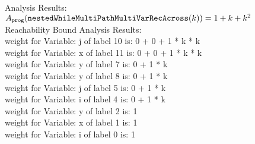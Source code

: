                                     Analysis Results: $ A_{\mathtt{prog}}(\mathtt{nestedWhileMultiPathMultiVarRecAcross}(k)) = 1 + k + k^2$
                                    \\
                                    Reachability Bound Analysis Results: \\
                                weight for Variable: j of label 10 is: 0 + 0 + 1 * k * k \\
                                    weight for Variable: x of label 11 is: 0 + 0 + 1 * k * k \\
                                    weight for Variable: y of label 7 is: 0 + 1 * k \\
                                    weight for Variable: y of label 8 is: 0 + 1 * k \\
                                    weight for Variable: j of label 5 is: 0 + 1 * k \\
                                    weight for Variable: i of label 4 is: 0 + 1 * k \\
                                    weight for Variable: y of label 2 is: 1 \\
                                    weight for Variable: x of label 1 is: 1 \\
                                    weight for Variable: i of label 0 is: 1 \\


